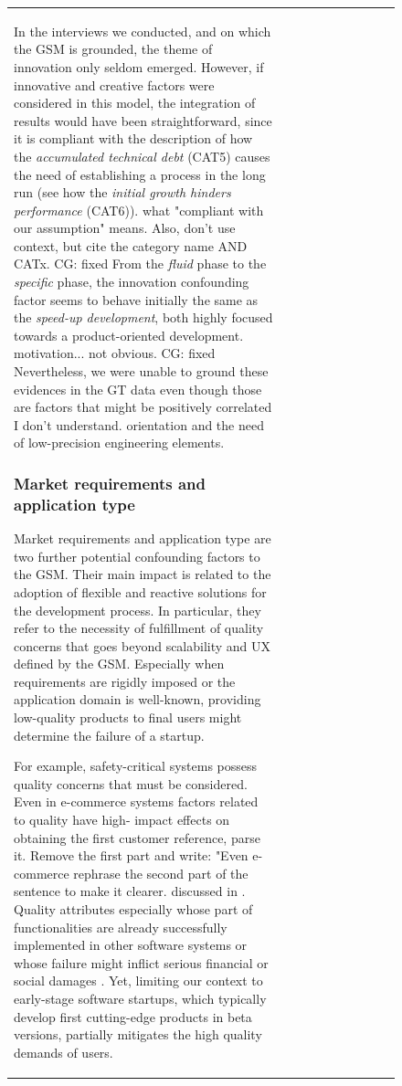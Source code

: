 \documentclass[12pt,journal,compsoc]{../sty/IEEEtran}
\begin{document}
\begin{table}[!t]
\begin{figure}[!t]
\begin{compactitem}
\begin{table}[!t]
\begin{tabular}{|l||c||c||c||c||c||c||c||c||c|}
In the interviews we conducted, and on which the GSM is grounded, the theme of
innovation only seldom emerged. However, if innovative and creative factors were
considered in this model, the integration of results would have been
straightforward, since it is compliant with the description of how the
\textit{accumulated technical debt} (CAT5) causes the need of establishing a
process in the long run (see how the \textit{initial growth hinders performance}
(CAT6)). %
what "compliant with our assumption" means. Also, don't use  %
context, but cite the category name AND CATx. CG: fixed From the \textit{fluid}
phase to the \textit{specific} phase, the innovation  confounding factor seems
to behave initially the same as the \textit{speed-up  development}, both highly
focused towards a product-oriented development.  %
motivation... not obvious. CG: fixed Nevertheless, we were unable to ground
these evidences in the GT data even  though those are factors that might be
positively correlated  %
I don't understand.  %
orientation and the need of  low-precision engineering elements.

\subsubsection{Market requirements and application type}  Market requirements
\cite{Coleman2007} and application type \cite{Sutton2000,  Coleman2008,
Coleman2008a} are two further potential confounding factors to the  GSM. Their
main impact is related to the adoption of flexible and reactive  solutions for
the development process. In particular, they refer to the  necessity of
fulfillment of quality concerns that goes beyond scalability and UX  defined by
the GSM. Especially when requirements are rigidly imposed or the  application
domain is well-known, providing low-quality products to final users  might
determine the failure of a startup.

For example, safety-critical systems possess quality concerns that must be
considered. Even in e-commerce systems factors related to quality have  high-
impact effects on obtaining the first customer reference,  %
parse it. Remove the first part and write: "Even e-commerce  %
rephrase the second part of the sentence to make it clearer.  %
discussed in \cite{Deakins2005,Kim2005,Silva2005}. Quality attributes
especially %
whose part of functionalities are already  successfully implemented in other
software systems or whose failure might  inflict serious financial or social
damages \cite{Bass2003}. Yet, limiting our  context to early-stage software
startups, which typically develop first  cutting-edge products in beta versions,
partially mitigates the high quality  demands of users.


\end{tabular}
\end{table}
\end{compactitem}
\end{figure}
\end{table}
\end{document}
